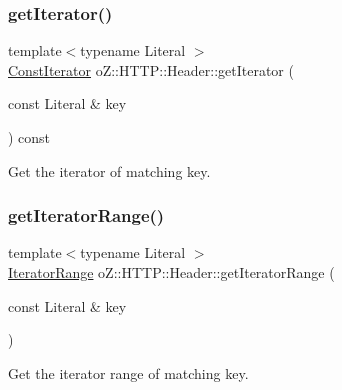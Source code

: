 \subsubsection{\texorpdfstring{getIterator()}{getIterator()}\hspace{0.1cm}{\footnotesize\ttfamily [2/2]}}
{\footnotesize\ttfamily template$<$typename Literal $>$ \\
\mbox{\hyperlink{classo_z_1_1_h_t_t_p_1_1_header_a509c1ea8f5b221246e6e49c01a115d69}{Const\+Iterator}} o\+Z\+::\+H\+T\+T\+P\+::\+Header\+::get\+Iterator (\begin{DoxyParamCaption}\item[{const Literal \&}]{key }\end{DoxyParamCaption}) const\hspace{0.3cm}{\ttfamily [inline]}}



Get the iterator of matching key. 

\mbox{\label{classo_z_1_1_h_t_t_p_1_1_header_ae30e471f7d522477cf022531a84e727a}} 
\subsubsection{\texorpdfstring{getIteratorRange()}{getIteratorRange()}\hspace{0.1cm}{\footnotesize\ttfamily [1/2]}}
{\footnotesize\ttfamily template$<$typename Literal $>$ \\
\mbox{\hyperlink{classo_z_1_1_h_t_t_p_1_1_header_a226f04d25adf24d2a683f82ef8327812}{Iterator\+Range}} o\+Z\+::\+H\+T\+T\+P\+::\+Header\+::get\+Iterator\+Range (\begin{DoxyParamCaption}\item[{const Literal \&}]{key }\end{DoxyParamCaption})\hspace{0.3cm}{\ttfamily [inline]}}



Get the iterator range of matching key. 

\mbox{\label{classo_z_1_1_h_t_t_p_1_1_header_acecb2a9ed8e432a4a3ab9c6170d73793}} 
